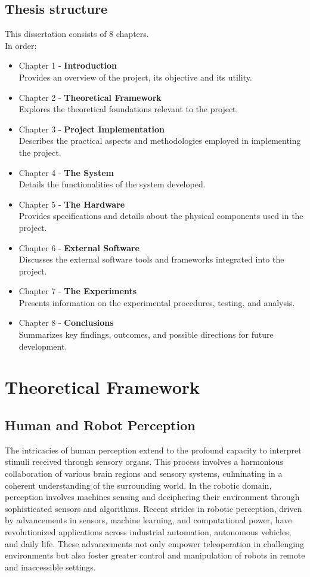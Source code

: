 \documentclass{Configuration_Files/PoliMi3i_thesis}
\begin{document}
\section {Thesis structure}
This dissertation consists of 8 chapters.
\\In order:
\begin{itemize}
    \item Chapter 1 - \textbf{Introduction}
\\Provides an overview of the project, its objective and its utility.
    \item Chapter 2 - \textbf{Theoretical Framework}
\\Explores the theoretical foundations relevant to the project.
    \item Chapter 3 - \textbf{Project Implementation}
\\Describes the practical aspects and methodologies employed in implementing the project.
    \item Chapter 4 - \textbf{The System}
\\Details the functionalities of the system developed.
    \item Chapter 5 - \textbf{The Hardware}
\\Provides specifications and details about the physical components used in the project.
    \item Chapter 6 - \textbf{External Software}
\\Discusses the external software tools and frameworks integrated into the project.
    \item Chapter 7 - \textbf{The Experiments}
\\Presents information on the experimental procedures, testing, and analysis.
    \item Chapter 8 - \textbf{Conclusions}
\\Summarizes key findings, outcomes, and possible directions for future development.
\end{itemize}

\chapter{Theoretical Framework}

\section{Human and Robot Perception}
The intricacies of human perception extend to the profound capacity to interpret stimuli received through sensory organs. This process involves a harmonious collaboration of various brain regions and sensory systems, culminating in a coherent understanding of the surrounding world. In the robotic domain, perception involves machines sensing and deciphering their environment through sophisticated sensors and algorithms.
Recent strides in robotic perception, driven by advancements in sensors, machine learning, and computational power, have revolutionized applications across industrial automation, autonomous vehicles, and daily life. These advancements not only empower teleoperation in challenging environments but also foster greater control and manipulation of robots in remote and inaccessible settings.
\end{document}
